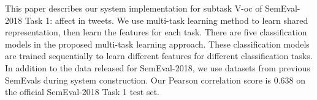 This paper describes our system implementation for subtask V-oc of SemEval-2018 Task 1: affect in tweets. We use multi-task learning method to learn shared representation, then learn the features for each task. There are five classification models in the proposed multi-task learning approach. These classification models are trained sequentially to learn different features for different classification tasks. In addition to the data released for SemEval-2018, we use datasets from previous SemEvals during system construction. Our Pearson correlation score is 0.638 on the official SemEval-2018 Task 1 test set.
